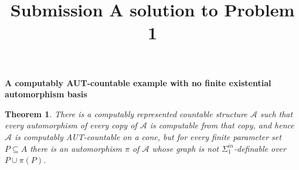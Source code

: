 \documentclass[12pt]{article}
\newtheorem{theorem}{Theorem}
\begin{document}
\title{Submission A solution to Problem 1}
\date{}
\maketitle

\begin{center}
{\bf A computably AUT-countable example with no finite existential
automorphism basis}
\end{center}

\begin{theorem}
There is a computably represented countable structure $\mathcal A$ such
that every automorphism of every copy of $\mathcal A$ is computable from
that copy, and hence $\mathcal A$ is computably AUT-countable on a cone,
but for every finite parameter set $P\subseteq A$ there is an
automorphism $\pi$ of $\mathcal A$ whose graph is not
$\Sigma^{in}_1$-definable over $P\cup\pi(P)$.
\end{theorem}
\end{document}

